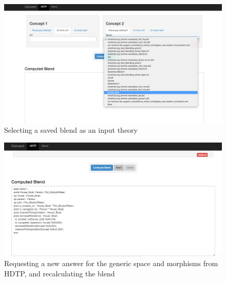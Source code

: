 \begin{figure}[!h]
\label{fig:ss6}
\begin{center}
\includegraphics[width=\textwidth]{ss6.png}
\end{center}
\caption{Selecting a saved blend as an input theory}
\end{figure}

\begin{figure}[!h]
\label{fig:ss7}
\begin{center}
\includegraphics[width=\textwidth]{ss7.png}
\end{center}
\caption{Requesting a new answer for the generic space and morphisms from HDTP, and recalculating the blend}
\end{figure}

